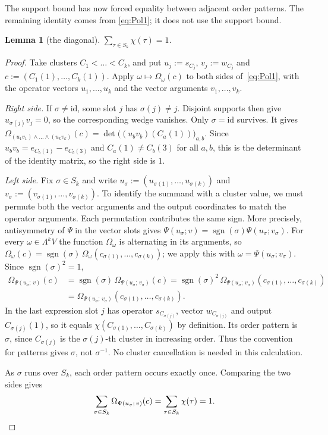 \documentclass[11pt]{amsart}
\newtheorem{lemma}[theorem]{Lemma}
\theoremstyle{definition}
\theoremstyle{remark}
\numberwithin{equation}{section}
\newcommand{\sgn}{\operatorname{sgn}}
\newcommand{\id}{\mathrm{id}}
\begin{document}
The support bound has now forced equality between adjacent order patterns. The remaining identity comes from
\eqref{eq:Pol1}; it does not use the support bound.

\begin{lemma}[the diagonal]\label{lem:D}
$\sum_{\tau\in S_k}\chi(\tau)=1$.
\end{lemma}

\begin{proof}
Take clusters $C_1<\dots<C_k$, and put $u_j:=s_{C_j}$, $v_j:=w_{C_j}$ and
$c:=(C_1(1),\dots,C_k(1))$. Apply $\omega\mapsto\Omega_\omega(c)$ to both sides of~\eqref{eq:Pol1}, with the operator
vectors $u_1,\dots,u_k$ and the vector arguments $v_1,\dots,v_k$.

\emph{Right side.} If $\sigma\ne\id$, some slot $j$ has $\sigma(j)\ne j$. Disjoint supports then give
$u_{\sigma(j)}v_j=0$, so the corresponding wedge vanishes. Only $\sigma=\id$ survives. It gives $\Omega_{(u_1v_1)\wedge\dots\wedge(u_kv_k)}(c)=\det\bigl((u_bv_b)(C_a(1))\bigr)_{a,b}$. Since
$u_bv_b=e_{C_b(1)}-e_{C_b(3)}$ and $C_a(1)\ne C_b(3)$ for all $a,b$, this is the determinant of the identity matrix, so
the right side is $1$.

\emph{Left side.} Fix $\sigma\in S_k$ and write $u_\sigma:=(u_{\sigma(1)},\dots,u_{\sigma(k)})$ and
$v_\sigma:=(v_{\sigma(1)},\dots,v_{\sigma(k)})$. To identify the summand with a cluster value, we must permute both the
vector arguments and the output coordinates to match the operator arguments. Each permutation contributes the same
sign. More precisely, antisymmetry of $\Psi$ in the vector slots gives
$\Psi(u_\sigma;v)=\sgn(\sigma)\Psi(u_\sigma;v_\sigma)$. For every $\omega\in\Lambda^kV$ the function $\Omega_\omega$ is
alternating in its arguments, so $\Omega_\omega(c)=\sgn(\sigma)\,\Omega_\omega(c_{\sigma(1)},\dots,c_{\sigma(k)})$; we
apply this with $\omega=\Psi(u_\sigma;v_\sigma)$. Since $\sgn(\sigma)^2=1$,
\begin{align*}
\Omega_{\Psi(u_\sigma;\,v)}(c)&=\sgn(\sigma)\,\Omega_{\Psi(u_\sigma;\,v_\sigma)}(c)
=\sgn(\sigma)^2\,\Omega_{\Psi(u_\sigma;\,v_\sigma)}(c_{\sigma(1)},\dots,c_{\sigma(k)})\\
&=\Omega_{\Psi(u_\sigma;\,v_\sigma)}(c_{\sigma(1)},\dots,c_{\sigma(k)}).
\end{align*}
In the last expression slot $j$ has operator $s_{C_{\sigma(j)}}$, vector $w_{C_{\sigma(j)}}$ and output
$C_{\sigma(j)}(1)$, so it equals $\chi(C_{\sigma(1)},\dots,C_{\sigma(k)})$ by definition. Its order pattern is $\sigma$,
since $C_{\sigma(j)}$ is the $\sigma(j)$\nobreakdash-th cluster in increasing order. Thus the convention for patterns
gives $\sigma$, not $\sigma^{-1}$. No cluster cancellation is needed in this calculation.

As $\sigma$ runs over $S_k$, each order pattern occurs exactly once. Comparing the two sides gives
\[
\sum_{\sigma\in S_k}\Omega_{\Psi(u_\sigma;\,v)}(c)=\sum_{\tau\in S_k}\chi(\tau)=1 .\qedhere
\]
\end{proof}
\end{document}
